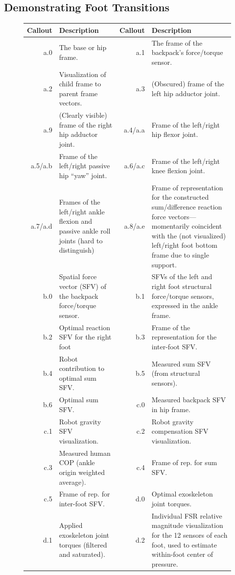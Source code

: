 \documentclass[utf8]{frontiersSCNS}
\begin{document}
\subsection{Demonstrating Foot Transitions}

 \begin{figure}[t]%
 	\centering%
	\resizebox{\textwidth}{!}{\footnotesize}\vspace{-.15in}
 	\footnotesize%
\begin{tabular}[t]{rp{}rp{}}
\toprule
Callout & Description&Callout & Description\\
\midrule
a.0 & The base or hip frame.&
 		a.1 & The frame of the backpack's  force/torque sensor.\\
 		a.2 & Visualization of child frame  to parent frame vectors.&
 		a.3 & (Obscured) frame of the left hip adductor joint.\\
 		a.9 & (Clearly visible) frame of the right hip adductor joint.&
 		a.4/a.a & Frame of the left/right hip flexor joint.\\
 		a.5/a.b & Frame of the left/right passive hip ``yaw'' joint.&
 		a.6/a.c & Frame of the left/right knee flexion joint.\\
 		a.7/a.d & Frames of the left/right ankle flexion and passive ankle roll joints (hard to distinguish) & 
 		a.8/a.e & Frame of representation for the constructed sum/difference reaction force vectors---momentarily coincident with the (not visualized) left/right foot bottom frame due to single support.\\
 		b.0 & Spatial force vector (SFV) of the backpack force/torque sensor.&
 		b.1 & SFVs of the left and right foot structural force/torque sensors, expressed in the ankle frame.\\
 		b.2 & Optimal reaction SFV for the right foot&
 		b.3 & Frame of the representation for the inter-foot SFV.\\
 		b.4 & Robot contribution to optimal sum SFV. &
 		b.5 & Measured sum SFV (from structural sensors).\\
 		b.6 & Optimal sum SFV.&
 		c.0 & Measured backpack SFV in hip frame.\\
 		c.1 & Robot gravity SFV visualization.&
 		c.2 & Robot gravity compensation SFV visualization.\\
 		c.3 & Measured human COP (ankle origin weighted average).&
 		c.4 & Frame of rep. for sum SFV.\\
 		c.5 & Frame of rep. for inter-foot SFV.&
 		d.0 & Optimal exoskeleton joint torques.\\
 		d.1 & Applied exoskeleton joint torques (filtered and saturated).&
 		d.2 & Individual FSR relative magnitude visualization for the 12 sensors of each foot, used to estimate within-foot center of pressure. \\
 		\bottomrule
\end{tabular}
 

\end{figure}
\end{document}
